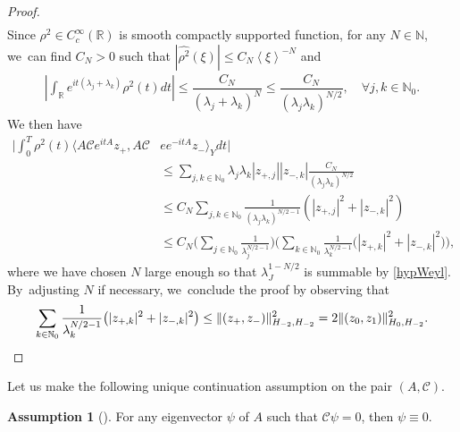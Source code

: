 \documentclass[JEP,XML,SOM,Unicode,published]{cedram}
\theoremstyle{definition}
\newtheorem{assum}{Assumption}
\newenvironment{assump}[2][]
{\renewcommand\theassum{#2}\begin{assum}[#1]}
{\end{assum}}
\let\mc\mathcal
\let\ld\lambda
\newcommand{\R}{\mathbb{R}}
\newcommand{\N}{\mathbb{N}}
\providecommand{\norm}[1]{\lVert#1\rVert}
\providecommand{\inn}[1]{\langle#1\rangle}
\begin{document}
\begin{proof}
\begin{align*}
\end{align*}
Since $\rho^2\in C_c^\infty(\R)$ is smooth compactly supported function, for any $N\in \N$, we~can find $C_N>0$ such that $|\widehat{\rho^2}(\xi)|\leq C_N \left<\xi\right>^{-N}$ and
\begin{align*}
\left|\int_\R e^{it(\ld_j+\ld_k)}\rho^2(t)dt\right|\leq \dfrac{C_N}{(\ld_j+\ld_k)^{N}} \leq\dfrac{C_N}{(\ld_j\ld_k)^{N/2}},\quad \forall j, k\in \N_0.
\end{align*}
We then have
\begin{align*}
\biggl|\int_0^T \rho^2(t)\inn{A\mc{C}e^{itA}z_+, A\mc{C}&ee^{-itA}z_-}_{Y}dt\biggr|\\
&\leq \sum_{j, k\in \N_0} \ld_j\ld_k |z_{+, j}||z_{-, k}|\frac{C_N}{(\ld_j\ld_k)^{N/2}}\\
&\leq C_N\sum_{j, k\in \N_0} \frac{1}{(\ld_j\ld_k)^{N/2-1}}\left(|z_{+, j}|^2+|z_{-, k}|^2\right)\\
&\leq C_N\biggl(\sum_{j\in \N_0}\frac{1}{\ld_j^{N/2-1}}\biggr)
\biggl(\sum_{k\in \N_0} \frac{1}{\ld_k^{N/2-1}}\big(|z_{+, k}|^2+|z_{-, k}|^2\big)\biggr),
\end{align*}
where we have chosen $N$ large enough so that $\ld_J^{1-N/2}$ is summable by \eqref{hypWeyl}. By~adjusting $N$ if necessary, we~conclude the proof by observing that
\begin{align*}
\sum_{k\in \N_0} \dfrac{1}{\ld_k^{N/2-1}} \big(|z_{+, k}|^2+|z_{-, k}|^2\big)\leq \norm{(z_+, z_-)}_{H_{-2}, H_{-2}}^2=2\norm{(z_0, z_1)}_{H_{0}, H_{-2}}^2.\qedhere
\end{align*}
\end{proof}

Let us make the following unique continuation assumption on the pair $(A, \mc{C})$.

\begin{assump}{UCP}\label{assumAeigen}
For any eigenvector $\psi$ of $A$ such that $\mc{C}\psi=0$, then $\psi\equiv 0$.
\end{assump}
\end{document}
